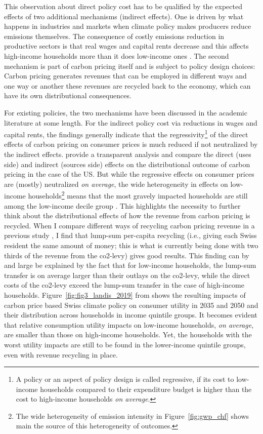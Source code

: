 \documentclass[referee, lineno, pdflatex,sn-apa]{sn-jnl}%
\theoremstyle{thmstyleone}%
\theoremstyle{thmstyletwo}%
\theoremstyle{thmstylethree}%
\begin{document}
This observation about direct policy cost has to be qualified by the expected effects of two additional mechanisms (indirect effects).
One is driven by what happens in industries and markets when climate policy makes producers reduce emissions themselves.
The consequence of costly emissions reduction in productive sectors is that real wages and capital rents decrease and this affects high-income households more than it does low-income ones \citep[see, e.g., ][]{landis_efficient_2019}.
The second mechanism is part of carbon pricing itself and is subject to policy design choices:
Carbon pricing generates revenues that can be employed in different ways and one way or another these revenues are recycled back to the economy, which can have its own distributional consequences.

For existing policies, the two mechanisms have been discussed in the academic literature at some length.
For the indirect policy cost via reductions in wages and capital rents, the findings generally indicate that the regressivity\footnote{%
  A policy or an aspect of policy design is called regressive, if its cost to low-income households compared to their expenditure budget is higher than the cost to high-income households \emph{on average}.
}
of the direct effects of carbon pricing on consumer prices is much reduced if not neutralized by the indirect effects.
\citet{rausch_distributional_2011} provide a transparent analysis and compare the direct (uses side) and indirect (sources side) effects on the distributional outcome of carbon pricing in the case of the US.
But while the regressive effects on consumer prices are (mostly) neutralized \emph{on average}, the wide heterogeneity in effects on low-income households\footnote{%
  The wide heterogeneity of emission intensity in Figure~\ref{fig:gwp_chf} shows main the source of this heterogeneity of outcomes.}
means that the most gravely impacted households are still among the low-income decile group \citep{landis_cost_2019, landis_efficient_2019}.
This highlights the necessity to further think about the distributional effects of how the revenue from carbon pricing is recycled.
When I compare different ways of recycling carbon pricing revenue in a previous study \citep{landis_cost_2019}, I find that lump-sum per-capita recycling (i.e., giving each Swiss resident the same amount of money; this is what is currently being done with two thirds of the revenue from the \ac{co2}-levy) gives good results.
This finding can by and large be explained by the fact that for low-income households, the lump-sum transfer is on average larger than their outlays on the \ac{co2}-levy, while the direct costs of the \ac{co2}-levy exceed the lump-sum transfer in the case of high-income households.
Figure~\ref{fig:fig3_landis_2019} from \citet{landis_cost_2019} shows the resulting impacts of carbon price based Swiss climate policy on consumer utility in 2035 and 2050 and their distribution across households in income quintile groups.
It becomes evident that relative consumption utility impacts on low-income households, \emph{on average}, are smaller than those on high-income households.
Yet, the households with the worst utility impacts are {still} to be found in the lower-income quintile groups, even with revenue recycling in place.
\end{document}
